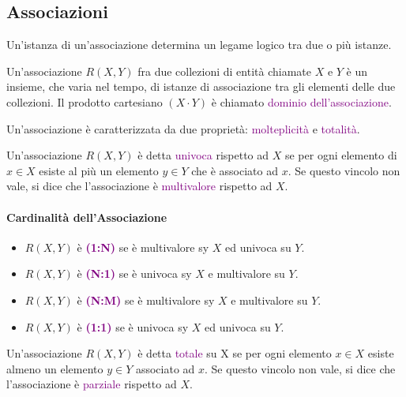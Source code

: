\subsection{Associazioni}

\begin{definition}
    Un'istanza di un'associazione determina un legame logico tra due o più istanze.
\end{definition}

\begin{definition}[Associazione]
    Un'associazione $R(X, Y)$ fra due collezioni di entità chiamate $X$ e $Y$
    è un insieme, che varia nel tempo, di istanze di associazione tra gli elementi delle due collezioni.
    Il prodotto cartesiano $(X \cdot Y)$ è chiamato \textcolor{purple}{dominio dell'associazione}.
\end{definition}

Un'associazione è caratterizzata da due proprietà: \textcolor{purple}{molteplicità} e \textcolor{purple}{totalità}.

\begin{definition}
    Un'associazione $R(X, Y)$ è detta \textcolor{purple}{univoca}
    rispetto ad $X$ se per ogni elemento di $x \in X$ esiste al più un elemento
    $y \in Y$ che è associato ad $x$. Se questo vincolo non vale, si dice che l'associazione
    è \textcolor{purple}{multivalore} rispetto ad $X$.
\end{definition}

\paragraph{Cardinalità dell'Associazione}

\begin{itemize}
    \item $R(X, Y)$ è \textbf{\textcolor{purple}{(1:N)}} se è multivalore sy $X$ ed univoca su $Y$.
    \item $R(X, Y)$ è \textbf{\textcolor{purple}{(N:1)}} se è univoca sy $X$ e multivalore su $Y$.
    \item $R(X, Y)$ è \textbf{\textcolor{purple}{(N:M)}} se è multivalore sy $X$ e multivalore su $Y$.
    \item $R(X, Y)$ è \textbf{\textcolor{purple}{(1:1)}} se è univoca sy $X$ ed univoca su $Y$.
\end{itemize}

\begin{definition}
    Un'associazione $R(X, Y)$ è detta \textcolor{purple}{totale} su X se per ogni elemento
    $x \in X$ esiste almeno un elemento $y \in Y$ associato ad $x$. Se questo vincolo non vale,
    si dice che l'associazione è \textcolor{purple}{parziale} rispetto ad $X$.
\end{definition}

